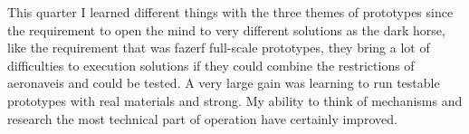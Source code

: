 This quarter I learned different things with the three themes of prototypes since the requirement to open the mind to very different solutions as the dark horse, like the requirement that was fazerf full-scale prototypes, they bring a lot of difficulties to execution solutions if they could combine the restrictions of aeronaveis and could be tested. 
A very large gain was learning to run testable prototypes with real materials and strong. My ability to think of mechanisms and research the most technical part of operation have certainly improved.
